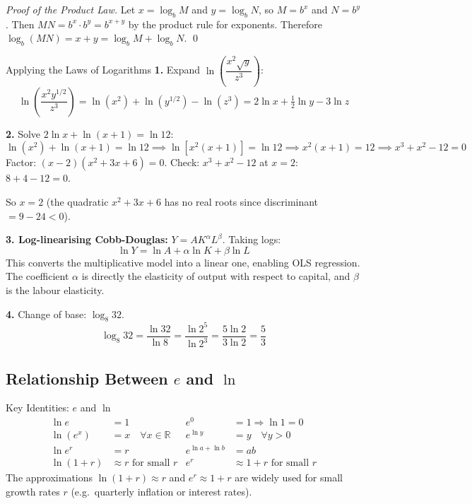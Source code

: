 \documentclass[12pt, a4paper]{article}
\theoremstyle{definition}
\newcommand{\R}{\mathbb{R}}
\begin{document}
\begin{proof}[Proof of the Product Law]
Let $x = \log_b M$ and $y = \log_b N$, so $M = b^x$ and $N = b^y$.
Then $MN = b^x \cdot b^y = b^{x+y}$ by the product rule for exponents.
Therefore $\log_b(MN) = x+y = \log_b M + \log_b N$. \qed
\end{proof}

\begin{exbox}{Applying the Laws of Logarithms}
\textbf{1.} Expand $\ln\!\left(\dfrac{x^2\sqrt{y}}{z^3}\right)$:
\[
  \ln\!\left(\frac{x^2 y^{1/2}}{z^3}\right)
  = \ln(x^2) + \ln(y^{1/2}) - \ln(z^3)
  = 2\ln x + \tfrac{1}{2}\ln y - 3\ln z
\]

\textbf{2.} Solve $2\ln x + \ln(x+1) = \ln 12$:
\[
  \ln(x^2) + \ln(x+1) = \ln 12
  \implies \ln[x^2(x+1)] = \ln 12
  \implies x^2(x+1) = 12
  \implies x^3 + x^2 - 12 = 0
\]
Factor: $(x-2)(x^2+3x+6)=0$. Check: $x^3+x^2-12$ at $x=2$: $8+4-12=0$. \checkmark

So $x=2$ (the quadratic $x^2+3x+6$ has no real roots since discriminant $=9-24<0$).

\textbf{3. Log-linearising Cobb-Douglas:}
$Y = AK^\alpha L^\beta$. Taking logs:
\[
  \ln Y = \ln A + \alpha \ln K + \beta \ln L
\]
This converts the multiplicative model into a linear one, enabling OLS regression. The coefficient $\alpha$ is directly the elasticity of output with respect to capital, and $\beta$ is the labour elasticity.

\textbf{4.} Change of base: $\log_8 32$.
\[
  \log_8 32 = \frac{\ln 32}{\ln 8} = \frac{\ln 2^5}{\ln 2^3} = \frac{5\ln 2}{3\ln 2} = \frac{5}{3}
\]
\end{exbox}

\subsection{Relationship Between $e$ and $\ln$}

\begin{factbox}{Key Identities: $e$ and $\ln$}
\begin{align*}
  \ln e &= 1 & e^0 &= 1 \Rightarrow \ln 1 = 0 \\
  \ln(e^x) &= x \quad \forall x \in \R & e^{\ln y} &= y \quad \forall y > 0 \\
  \ln e^r &= r & e^{\ln a + \ln b} &= ab \\
  \ln(1+r) &\approx r \text{ for small } r & e^r &\approx 1+r \text{ for small } r
\end{align*}
The approximations $\ln(1+r)\approx r$ and $e^r\approx 1+r$ are widely used
for small growth rates $r$ (e.g.\ quarterly inflation or interest rates).
\end{factbox}
\end{document}
